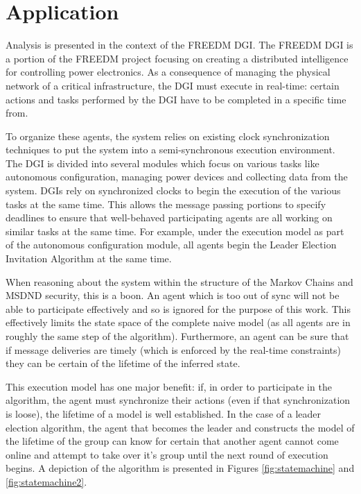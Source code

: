 \section{Application}
Analysis is presented in the context of the FREEDM DGI. The FREEDM DGI is a portion of the FREEDM project focusing on creating a distributed intelligence for controlling power electronics. As a consequence of managing the physical network of a critical infrastructure, the DGI must execute in real-time: certain actions and tasks performed by the DGI have to be completed in a specific time from.

To organize these agents, the system relies on existing clock synchronization techniques to put the system into a semi-synchronous execution environment. The DGI is divided into several modules which focus on various tasks like autonomous configuration, managing power devices and collecting data from the system. DGIs rely on synchronized clocks to begin the execution of the various tasks at the same time. This allows the message passing portions to specify deadlines to ensure that well-behaved participating agents are all working on similar tasks at the same time. For example, under the execution model as part of the autonomous configuration module, all agents begin the Leader Election Invitation Algorithm at the same time.

When reasoning about the system within the structure of the Markov Chains and MSDND security, this is a boon. An agent which is too out of sync will not be able to participate effectively and so is ignored for the purpose of this work. This effectively limits the state space of the complete naive model (as all agents are in roughly the same step of the algorithm). Furthermore, an agent can be sure that if message deliveries are timely (which is enforced by the real-time constraints) they can be certain of the lifetime of the inferred state.

This execution model has one major benefit: if, in order to participate in the algorithm, the agent must synchronize their actions (even if that synchronization is loose), the lifetime of a model is well established. In the case of a leader election algorithm, the agent that becomes the leader and constructs the model of the lifetime of the group can know for certain that another agent cannot come online and attempt to take over it's group until the next round of execution begins. A depiction of the algorithm is presented in Figures \ref{fig:statemachine} and \ref{fig:statemachine2}.

